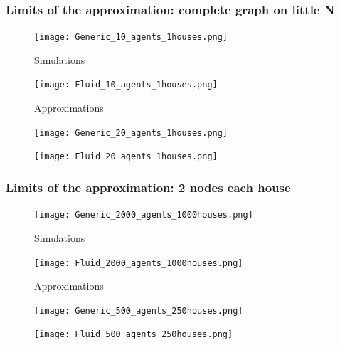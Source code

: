 \documentclass{beamer}
\begin{document}
\begin{frame}
\frametitle{Limits of the approximation: complete graph on little N}

\begin{figure}
	\centering
	\begin{minipage}{0.45\textwidth}
		\centering
		\texttt{[image: Generic\_10\_agents\_1houses.png]} %
		\caption*{Simulations}
	\end{minipage}\hfill
	\begin{minipage}{0.45\textwidth}
		\centering
		\texttt{[image: Fluid\_10\_agents\_1houses.png]} %
		\caption*{Approximations}
	\end{minipage}
\end{figure}

\begin{figure}
	\centering
	\begin{minipage}{0.45\textwidth}
		\centering
		\texttt{[image: Generic\_20\_agents\_1houses.png]} %
		\caption*{}
	\end{minipage}\hfill
	\begin{minipage}{0.45\textwidth}
		\centering
		\texttt{[image: Fluid\_20\_agents\_1houses.png]} %
		\caption*{}
	\end{minipage}
\end{figure}

\end{frame}







	\begin{frame}


\frametitle{Limits of the approximation: 2 nodes each house}

\begin{figure}
	\centering
	\begin{minipage}{0.45\textwidth}
		\centering
		\texttt{[image: Generic\_2000\_agents\_1000houses.png]} %
		\caption*{Simulations}
	\end{minipage}\hfill
	\begin{minipage}{0.45\textwidth}
		\centering
		\texttt{[image: Fluid\_2000\_agents\_1000houses.png]} %
		\caption*{Approximations}
	\end{minipage}
\end{figure}

\begin{figure}
	\centering
	\begin{minipage}{0.45\textwidth}
		\centering
		\texttt{[image: Generic\_500\_agents\_250houses.png]} %
		\caption*{}
	\end{minipage}\hfill
	\begin{minipage}{0.45\textwidth}
		\centering
		\texttt{[image: Fluid\_500\_agents\_250houses.png]} %
		\caption*{}
	\end{minipage}
\end{figure}

\end{frame}
\end{document}
